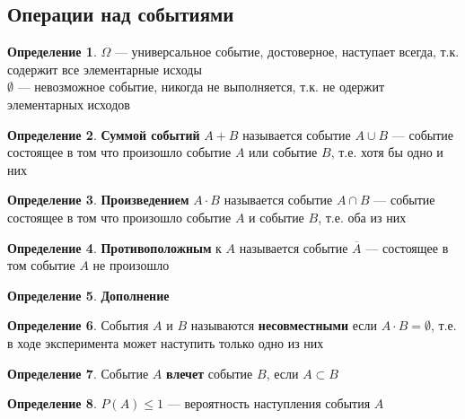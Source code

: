 \documentclass[english]{article}
\theoremstyle{plain}
\theoremstyle{remark}
\theoremstyle{definition}
\newtheorem*{definition}{Определение}
\begin{document}
\subsection{Операции над событиями}
\label{sec:orgec65635}
\begin{definition}
\(\Omega\) --- универсальное событие, достоверное, наступает всегда, т.к. содержит все элементарные исходы \\
\(\emptyset\) --- невозможное событие, никогда не выполняется, т.к. не одержит элементарных исходов
\end{definition}
\begin{definition}
\textbf{Суммой событий} \(A + B\) называется событие \(A \cup B\) --- событие
 состоящее в том что произошло событие \(A\) или событие \(B\), т.е. хотя
 бы одно и них
\end{definition}
\begin{definition}
\textbf{Произведением} \(A \cdot B\) называется событие \(A \cap B\) --- событие состоящее в том что произошло событие \(A\) и событие \(B\), т.е. оба из них
\end{definition}
\begin{definition}
\textbf{Противоположным} к \(A\) называется событие \(\overline{A}\) --- состоящее в том событие \(A\) не произошло
\end{definition}
\begin{center}
\end{center}
\begin{definition}
\textbf{Дополнение}
\end{definition}
\begin{definition}
События \(A\) и \(B\) называются \textbf{несовместными} если \(A\cdot B = \emptyset\), т.е. в ходе эксперимента может наступить только одно из них
\end{definition}
\begin{definition}
Событие \(A\) \textbf{влечет} событие \(B\), если \(A \subset B\)
\end{definition}
\begin{definition}
\(P(A) \le 1\) --- вероятность наступления события \(A\)
\end{definition}
\end{document}
